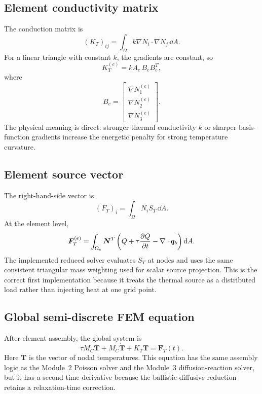 \documentclass[11pt]{article}
\begin{document}
\subsection{Element conductivity matrix}
The conduction matrix is
\begin{equation}
    (K_T)_{ij}=\int_\Omega k\nabla N_i\cdot\nabla N_j\,\dd A.
\end{equation}
For a linear triangle with constant \(k\), the gradients are constant, so
\begin{equation}
    \boxed{
    K_T^{(e)}=k A_e\,B_eB_e^T,}
    \label{eq:module4_element_conductivity_matrix}
\end{equation}
where
\begin{equation}
    B_e=
    \begin{bmatrix}
    \nabla N_1^{(e)}\\
    \nabla N_2^{(e)}\\
    \nabla N_3^{(e)}
    \end{bmatrix}.
\end{equation}
The physical meaning is direct: stronger thermal conductivity \(k\) or sharper basis-function gradients increase the energetic penalty for strong temperature curvature.

\subsection{Element source vector}
The right-hand-side vector is
\begin{equation}
    (F_T)_i=\int_\Omega N_iS_T\,\dd A.
\end{equation}
At the element level,
\begin{equation}
    \bm{F}_T^{(e)}=\int_{\Omega_e}\bm{N}^T
    \left(Q+\tau\pdv{Q}{t}-\nabla\cdot\bm{q}_b\right)\mathop{}\!\mathrm{d} A.
    \label{eq:module4_element_source_vector}
\end{equation}
The implemented reduced solver evaluates \(S_T\) at nodes and uses the same consistent triangular mass weighting used for scalar source projection. This is the correct first implementation because it treats the thermal source as a distributed load rather than injecting heat at one grid point.

\subsection{Global semi-discrete FEM equation}
After element assembly, the global system is
\begin{equation}
    \boxed{
    \tau M_C\ddot{\bm{T}}+M_C\dot{\bm{T}}+K_T\bm{T}=\bm{F}_T(t).}
    \label{eq:module4_global_fem_system}
\end{equation}
Here \(\bm{T}\) is the vector of nodal temperatures. This equation has the same assembly logic as the Module~2 Poisson solver and the Module~3 diffusion-reaction solver, but it has a second time derivative because the ballistic-diffusive reduction retains a relaxation-time correction.
\end{document}
